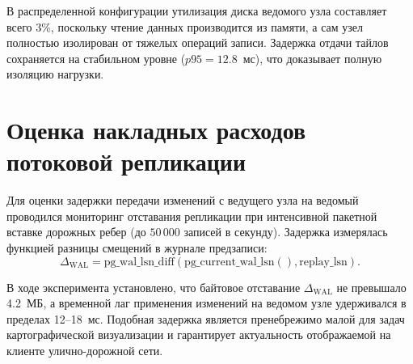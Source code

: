 В распределенной конфигурации утилизация диска ведомого узла составляет всего 3\%, поскольку чтение данных производится из памяти, а сам узел полностью изолирован от тяжелых операций записи. Задержка отдачи тайлов сохраняется на стабильном уровне ($p95 = 12.8$~мс), что доказывает полную изоляцию нагрузки.

\section{Оценка накладных расходов потоковой репликации}
\label{sec:wal_replication_lag}

Для оценки задержки передачи изменений с ведущего узла на ведомый проводился мониторинг отставания репликации при интенсивной пакетной вставке дорожных ребер (до $50\,000$ записей в секунду). Задержка измерялась функцией разницы смещений в журнале предзаписи:
\begin{equation}
\Delta_{\text{WAL}} = \text{pg\_wal\_lsn\_diff}(\text{pg\_current\_wal\_lsn}(), \text{replay\_lsn}).
\label{eq:wal_diff}
\end{equation}

В ходе эксперимента установлено, что байтовое отставание $\Delta_{\text{WAL}}$ не превышало 4.2~МБ, а временной лаг применения изменений на ведомом узле удерживался в пределах 12--18~мс. Подобная задержка является пренебрежимо малой для задач картографической визуализации и гарантирует актуальность отображаемой на клиенте улично-дорожной сети.
